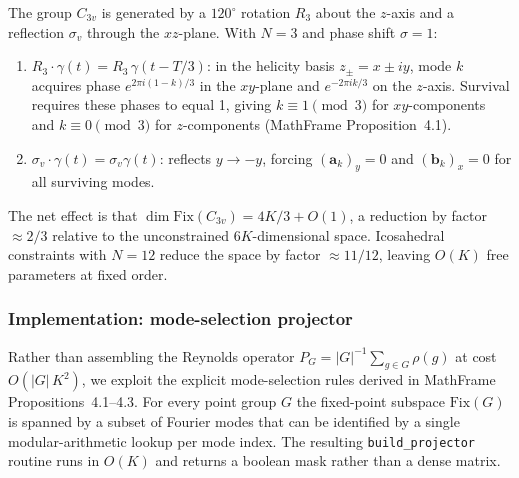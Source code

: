 \documentclass[12pt, a4paper]{article}
\theoremstyle{definition}
\newcommand{\Fix}{\mathrm{Fix}}
\newcommand{\bfa}{\mathbf{a}}
\newcommand{\bfb}{\mathbf{b}}
\begin{document}
The group $C_{3v}$ is generated by a $120^\circ$ rotation $R_3$ about the
$z$-axis and a reflection $\sigma_v$ through the $xz$-plane.  With $N = 3$
and phase shift $\sigma = 1$:

\begin{enumerate}[leftmargin=1.8em]
  \item $R_3 \cdot \gamma(t) = R_3\,\gamma(t - T/3)$: in the helicity basis
        $z_\pm = x \pm iy$, mode $k$ acquires phase $e^{2\pi i(1-k)/3}$ in the
        $xy$-plane and $e^{-2\pi ik/3}$ on the $z$-axis.  Survival requires
        these phases to equal 1, giving $k \equiv 1 \pmod{3}$ for
        $xy$-components and $k \equiv 0 \pmod{3}$ for $z$-components
        (MathFrame Proposition~4.1).
  \item $\sigma_v \cdot \gamma(t) = \sigma_v \gamma(t)$: reflects $y \to -y$,
        forcing $(\bfa_k)_y = 0$ and $(\bfb_k)_x = 0$ for all surviving modes.
\end{enumerate}

The net effect is that $\dim\Fix(C_{3v}) = 4K/3 + O(1)$, a reduction by
factor $\approx 2/3$ relative to the unconstrained $6K$-dimensional space.
Icosahedral constraints with $N = 12$ reduce the space by factor $\approx
11/12$, leaving $O(K)$ free parameters at fixed order.

\subsubsection{Implementation: mode-selection projector}

Rather than assembling the Reynolds operator $P_G = |G|^{-1}\sum_{g\in G}\rho(g)$
at cost $O(|G|\,K^2)$, we exploit the explicit mode-selection rules derived in
MathFrame~\cite{MathFrame2026} Propositions~4.1--4.3.  For every point group
$G$ the fixed-point subspace $\Fix(G)$ is spanned by a subset of Fourier modes
that can be identified by a single modular-arithmetic lookup per mode index.
The resulting \texttt{build\_projector} routine runs in $O(K)$ and returns a
boolean mask rather than a dense matrix.
\end{document}
